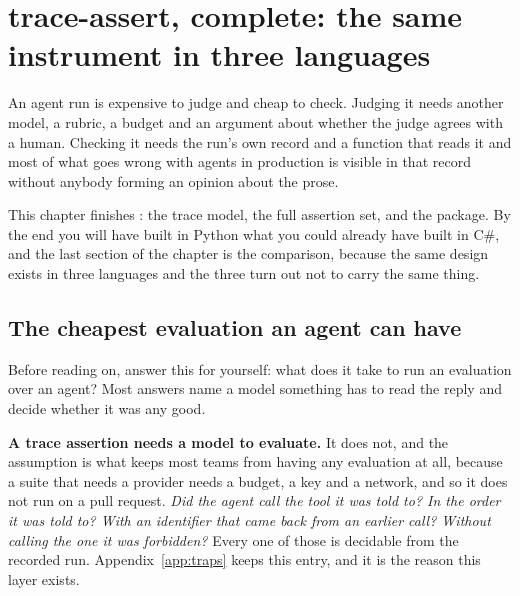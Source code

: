
\chapter{trace-assert, complete: the same instrument in three languages}
\label{ch:traceassert}

\noindent
An agent run is expensive to judge and cheap to check. Judging it needs
another model, a rubric, a budget and an argument about whether the judge
agrees with a human. Checking it needs the run's own record and a function
that reads it \dash{} and most of what goes wrong with agents in production
is visible in that record without anybody forming an opinion about the
prose.

This chapter finishes : the trace model, the full
assertion set, and the package. By the end you will have built in Python
what you could already have built in C\#, and the last section of the
chapter is the comparison, because the same design exists in three
languages and the three turn out not to carry the same thing.

\section{The cheapest evaluation an agent can have}
\label{sec:ch14-cheapest}

Before reading on, answer this for yourself: what does it take to run an
evaluation over an agent? Most answers name a model \dash{} something has
to read the reply and decide whether it was any good.

\begin{trapbox}
\textbf{A trace assertion needs a model to evaluate.} It does not, and the
assumption is what keeps most teams from having any evaluation at all,
because a suite that needs a provider needs a budget, a key and a network,
and so it does not run on a pull request. \emph{Did the agent call the tool
it was told to? In the order it was told to? With an identifier that came
back from an earlier call? Without calling the one it was forbidden?}
Every one of those is decidable from the recorded run. Appendix~\ref{app:traps}
keeps this entry, and it is the reason this layer exists.
\end{trapbox}


